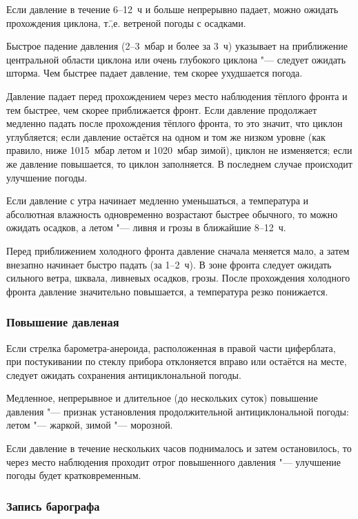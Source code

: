  Если давление в течение 6--12~ч и больше непрерывно падает, можно
ожидать прохождения циклона, т.\=,е. ветреной погоды с осадками.

 Быстрое падение давления (2--3~мбар и более за 3~ч)
указывает на приближение центральной области циклона или очень
глубокого циклона "--- следует ожидать шторма. Чем быстрее падает
давление, тем скорее ухудшается погода.

 Давление падает перед прохождением через место наблюдения
тёплого фронта и тем быстрее, чем скорее приближается фронт. Если
давление продолжает медленно падать после прохождения тёплого фронта,
то это значит, что циклон углубляется; если давление остаётся на одном
и том же низком уровне (как правило, ниже 1015~мбар летом и 1020~мбар
зимой), циклон не изменяется; если же давление повышается, то циклон
заполняется. В последнем случае происходит улучшение погоды.

 Если давление с утра начинает медленно уменьшаться, а
температура и абсолютная влажность одновременно возрастают быстрее
обычного, то можно ожидать осадков, а летом "--- ливня и грозы в
ближайшие 8--12~ч.

 Перед приближением холодного фронта давление сначала меняется
мало, а затем внезапно начинает быстро падать (за 1--2~ч). В зоне
фронта следует ожидать сильного ветра, шквала, ливневых осадков,
грозы. После прохождения холодного фронта давление значительно
повышается, а температура резко понижается.

\subsubsection{Повышение давленая}

 Если стрелка барометра-анероида, расположенная в правой части
циферблата, при постукивании по стеклу прибора отклоняется вправо или
остаётся на месте, следует ожидать сохранения антициклональной погоды.

 Медленное, непрерывное и длительное (до нескольких суток)
повышение давления "--- признак установления продолжительной
антициклональной погоды: летом "--- жаркой, зимой "--- морозной.

 Если давление в течение нескольких часов поднималось и затем
остановилось, то через место наблюдения проходит отрог повышенного
давления "--- улучшение погоды будет кратковременным.

\subsubsection{Запись барографа}

